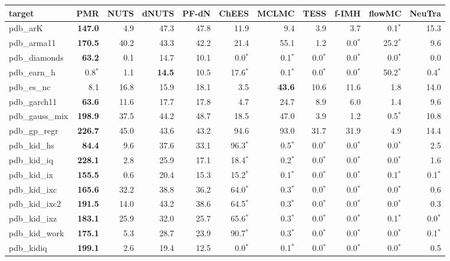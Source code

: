 \begin{tabular}{lrrrrrrrrrr}
\toprule
target & PMR & NUTS & dNUTS & PF-dN & ChEES & MCLMC & TESS & f-IMH & flowMC & NeuTra \\
\midrule
pdb\_arK & \textbf{147.0} & 4.9 & 47.3 & 47.8 & 11.9 & 9.4 & 3.9 & 3.7 & 0.1$^{*}$ & 15.3 \\
pdb\_arma11 & \textbf{170.5} & 40.2 & 43.3 & 42.2 & 21.4 & 55.1 & 1.2 & 0.0$^{*}$ & 25.2$^{*}$ & 9.6 \\
pdb\_diamonds & \textbf{63.2} & 0.1 & 14.7 & 10.1 & 0.0$^{*}$ & 0.1$^{*}$ & 0.0$^{*}$ & 0.0$^{*}$ & 0.0$^{*}$ & 0.0 \\
pdb\_earn\_h & 0.8$^{*}$ & 1.1 & \textbf{14.5} & 10.5 & 17.6$^{*}$ & 0.1$^{*}$ & 0.0$^{*}$ & 0.0$^{*}$ & 50.2$^{*}$ & 0.4$^{*}$ \\
pdb\_es\_nc & 8.1 & 16.8 & 15.9 & 18.1 & 3.5 & \textbf{43.6} & 10.6 & 11.6 & 1.8 & 14.0 \\
pdb\_garch11 & \textbf{63.6} & 11.6 & 17.7 & 17.8 & 4.7 & 24.7 & 8.9 & 6.0 & 1.4 & 9.6 \\
pdb\_gauss\_mix & \textbf{198.9} & 37.5 & 44.2 & 48.7 & 18.5 & 47.0 & 3.9 & 1.2 & 0.5$^{*}$ & 10.8 \\
pdb\_gp\_regr & \textbf{226.7} & 45.0 & 43.6 & 43.2 & 94.6 & 93.0 & 31.7 & 31.9 & 4.9 & 14.4 \\
pdb\_kid\_hs & \textbf{84.4} & 9.6 & 37.6 & 33.1 & 96.3$^{*}$ & 0.5$^{*}$ & 0.0$^{*}$ & 0.0$^{*}$ & 0.0$^{*}$ & 2.5 \\
pdb\_kid\_iq & \textbf{228.1} & 2.8 & 25.9 & 17.1 & 18.4$^{*}$ & 0.2$^{*}$ & 0.0$^{*}$ & 0.0$^{*}$ & 0.0$^{*}$ & 1.6 \\
pdb\_kid\_ix & \textbf{155.5} & 0.6 & 20.4 & 15.3 & 15.2$^{*}$ & 0.1$^{*}$ & 0.0$^{*}$ & 0.0$^{*}$ & 0.1$^{*}$ & 0.1$^{*}$ \\
pdb\_kid\_ixc & \textbf{165.6} & 32.2 & 38.8 & 36.2 & 64.0$^{*}$ & 0.3$^{*}$ & 0.0$^{*}$ & 0.0$^{*}$ & 0.0$^{*}$ & 0.6 \\
pdb\_kid\_ixc2 & \textbf{191.5} & 14.0 & 43.2 & 38.6 & 64.5$^{*}$ & 0.3$^{*}$ & 0.0$^{*}$ & 0.0$^{*}$ & 0.0$^{*}$ & 0.3 \\
pdb\_kid\_ixz & \textbf{183.1} & 25.9 & 32.0 & 25.7 & 65.6$^{*}$ & 0.3$^{*}$ & 0.0$^{*}$ & 0.0$^{*}$ & 0.1$^{*}$ & 0.0$^{*}$ \\
pdb\_kid\_work & \textbf{175.1} & 5.3 & 28.7 & 23.9 & 90.7$^{*}$ & 0.3$^{*}$ & 0.0$^{*}$ & 0.0$^{*}$ & 0.0$^{*}$ & 0.1$^{*}$ \\
pdb\_kidiq & \textbf{199.1} & 2.6 & 19.4 & 12.5 & 0.0$^{*}$ & 0.1$^{*}$ & 0.0$^{*}$ & 0.0$^{*}$ & 0.0$^{*}$ & 0.5 \\

\end{tabular}
